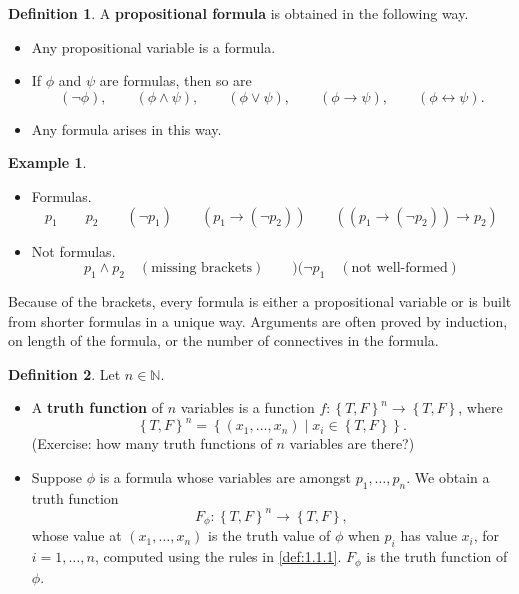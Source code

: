 \documentclass{article}
\newcommand{\N}{\mathbb{N}}
\newcommand{\rb}[1]{\left( #1 \right)}
\newcommand{\cb}[1]{\left\{ #1 \right\}}
\newcommand{\notb}[1]{\rb{\neg #1}}
\newcommand{\orb}[2]{\rb{#1 \lor #2}}
\newcommand{\andb}[2]{\rb{#1 \land #2}}
\newcommand{\impb}[2]{\rb{#1 \rightarrow #2}}
\newcommand{\iffb}[2]{\rb{#1 \leftrightarrow #2}}
\theoremstyle{definition}\newtheorem{definition}{Definition}[subsection]
\theoremstyle{definition}\newtheorem{remark1}[definition]{Remark}
\theoremstyle{definition}\newtheorem{example1}[definition]{Example}
\theoremstyle{definition}\newtheorem*{remark2}{Remark}
\theoremstyle{definition}\newtheorem*{example2}{Example}
\theoremstyle{definition}\newtheorem*{note}{Note}
\theoremstyle{definition}\newtheorem*{notation}{Notation}
\begin{document}
\begin{definition}
\label{def:1.1.2}
A \textbf{propositional formula} is obtained in the following way.
\begin{itemize}
\item Any propositional variable is a formula.
\item If $ \phi $ and $ \psi $ are formulas, then so are
$$ \notb{\phi}, \qquad \andb{\phi}{\psi}, \qquad \orb{\phi}{\psi}, \qquad \impb{\phi}{\psi}, \qquad \iffb{\phi}{\psi}. $$
\item Any formula arises in this way.
\end{itemize}
\end{definition}

\pagebreak

\begin{example2}
\hfill
\begin{itemize}
\item Formulas.
$$ p_1 \qquad p_2 \qquad \notb{p_1} \qquad \impb{p_1}{\notb{p_2}} \qquad \impb{\impb{p_1}{\notb{p_2}}}{p_2} $$
\item Not formulas.
$$ p_1 \land p_2 \quad \rb{\text{missing brackets}} \qquad )( \neg p_1 \quad \rb{\text{not well-formed}} $$
\end{itemize}
\end{example2}

Because of the brackets, every formula is either a propositional variable or is built from shorter formulas in a unique way. Arguments are often proved by induction, on length of the formula, or the number of connectives in the formula.

\begin{definition}
Let $ n \in \N $.
\begin{itemize}
\item A \textbf{truth function} of $ n $ variables is a function $ f : \cb{T, F}^n \to \cb{T, F} $, where
$$ \cb{T, F}^n = \cb{\rb{x_1, \dots, x_n} \mid x_i \in \cb{T, F}}. $$
(Exercise: how many truth functions of $ n $ variables are there?)
\item Suppose $ \phi $ is a formula whose variables are amongst $ p_1, \dots, p_n $. We obtain a truth function
$$ F_\phi : \cb{T, F}^n \to \cb{T, F}, $$
whose value at $ \rb{x_1, \dots, x_n} $ is the truth value of $ \phi $ when $ p_i $ has value $ x_i $, for $ i = 1, \dots, n $, computed using the rules in \ref{def:1.1.1}. $ F_\phi $ is the truth function of $ \phi $.
\end{itemize}
\end{definition}
\end{document}
